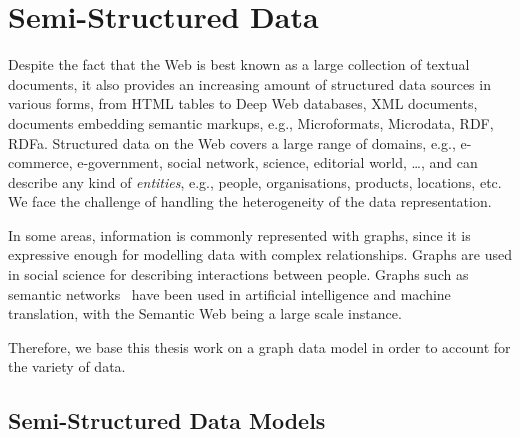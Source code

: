 \chapter{Semi-Structured Data}
\label{chap:ssd}

Despite the fact that the Web is best known as a large collection of textual documents, it also provides an increasing amount of structured data sources in various forms, from HTML tables to Deep Web databases, XML documents, documents embedding semantic markups, e.g., Microformats, Microdata, RDF, RDFa. Structured data on the Web covers a large range of domains, e.g., e-commerce, e-government, social network, science, editorial world, \ldots, and can describe any kind of \emph{entities}, e.g., people, organisations, products, locations, etc. We face the challenge of handling the heterogeneity of the data representation.

In some areas, information is commonly represented with graphs, since it is expressive enough for modelling data with complex relationships. Graphs are used in social science for describing interactions between people. Graphs such as semantic networks~\cite{sowa2006semantic} have been used in artificial intelligence and machine translation, with the Semantic Web being a large scale instance.

Therefore, we base this thesis work on a graph data model in order to account for the variety of data.

%

\section{Semi-Structured Data Models}

